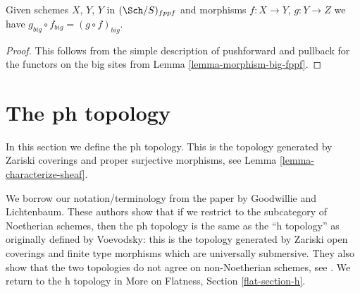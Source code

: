 \begin{lemma}
\label{lemma-composition-fppf}
Given schemes $X$, $Y$, $Y$ in $(\Sch/S)_{fppf}$
and morphisms $f : X \to Y$, $g : Y \to Z$ we have
$g_{big} \circ f_{big} = (g \circ f)_{big}$.
\end{lemma}

\begin{proof}
This follows from the simple description of pushforward
and pullback for the functors on the big sites from
Lemma \ref{lemma-morphism-big-fppf}.
\end{proof}



















































\section{The ph topology}
\label{section-ph}

\noindent
In this section we define the ph topology. This is the topology
generated by Zariski coverings and proper surjective morphisms, see
Lemma \ref{lemma-characterize-sheaf}.

\medskip\noindent
We borrow our notation/terminology
from the paper \cite{ph} by Goodwillie and Lichtenbaum.
These authors show that if we restrict to the subcategory of
Noetherian schemes, then the ph topology is the same as the
``h topology'' as originally defined by Voevodsky: this is
the topology generated by Zariski open coverings and
finite type morphisms which are universally submersive.
They also show that the two topologies do not agree on
non-Noetherian schemes, see \cite[Example 4.5]{ph}.
We return to the h topology in
More on Flatness, Section \ref{flat-section-h}.


